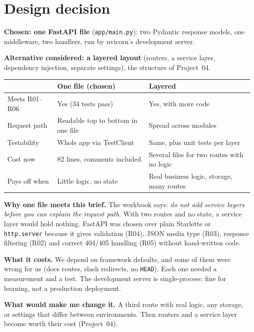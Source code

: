 \documentclass[11pt,a4paper]{article}
\newcommand{\code}[1]{\texttt{#1}}
\begin{document}
\section{Design decision}

\textbf{Chosen: one FastAPI file} (\code{app/main.py}): two Pydantic response
models, one middleware, two handlers, run by uvicorn's development server.

\textbf{Alternative considered: a layered layout} (routers, a service layer,
dependency injection, separate settings), the structure of Project~04.

\begin{tabularx}{\linewidth}{@{}l L L@{}}
\toprule
& \textbf{One file (chosen)} & \textbf{Layered} \\
\midrule
Meets R01--R06 & Yes (34 tests pass) & Yes, with more code \\
Request path & Readable top to bottom in one file & Spread across modules \\
Testability & Whole app via TestClient & Same, plus unit tests per layer \\
Cost now & 82 lines, comments included & Several files for two routes with no logic \\
Pays off when & Little logic, no state & Real business logic, storage, many routes \\
\bottomrule
\end{tabularx}

\textbf{Why one file meets this brief.} The workbook says: \emph{do not add
service layers before you can explain the request path}. With two routes and
no state, a service layer would hold nothing. FastAPI was chosen over plain
Starlette or \code{http.server} because it gives validation (R04), JSON
media type (R03), response filtering (R02) and correct 404/405 handling
(R05) without hand-written code.

\textbf{What it costs.} We depend on framework defaults, and some of them were
wrong for us (docs routes, slash redirects, no \code{HEAD}). Each one needed a
measurement and a test. The development server is single-process: fine for
learning, not a production deployment.

\textbf{What would make me change it.} A third route with real logic, any
storage, or settings that differ between environments. Then routers and a
service layer become worth their cost (Project~04).

\end{document}
